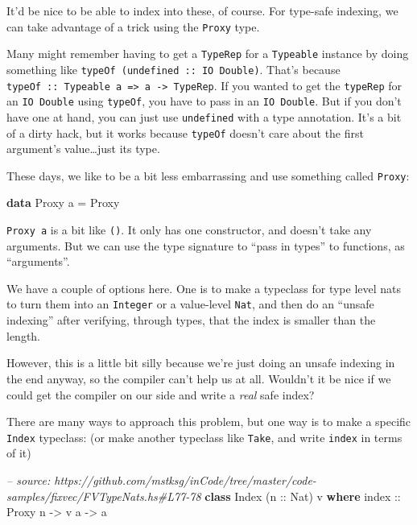 \documentclass[]{article}
\newenvironment{Shaded}{}{}
\newcommand{\KeywordTok}[1]{\textcolor[rgb]{0.00,0.44,0.13}{\textbf{{#1}}}}
\newcommand{\DataTypeTok}[1]{\textcolor[rgb]{0.56,0.13,0.00}{{#1}}}
\newcommand{\CommentTok}[1]{\textcolor[rgb]{0.38,0.63,0.69}{\textit{{#1}}}}
\newcommand{\OtherTok}[1]{\textcolor[rgb]{0.00,0.44,0.13}{{#1}}}
\newcommand{\FunctionTok}[1]{\textcolor[rgb]{0.02,0.16,0.49}{{#1}}}
\newcommand{\NormalTok}[1]{{#1}}
\begin{document}
It'd be nice to be able to index into these, of course. For type-safe
indexing, we can take advantage of a trick using the \texttt{Proxy}
type.

Many might remember having to get a \texttt{TypeRep} for a
\texttt{Typeable} instance by doing something like
\texttt{typeOf\ (undefined\ ::\ IO\ Double)}. That's because
\texttt{typeOf\ ::\ Typeable\ a\ =\textgreater{}\ a\ -\textgreater{}\ TypeRep}.
If you wanted to get the \texttt{typeRep} for an \texttt{IO\ Double}
using \texttt{typeOf}, you have to pass in an \texttt{IO\ Double}. But
if you don't have one at hand, you can just use \texttt{undefined} with
a type annotation. It's a bit of a dirty hack, but it works because
\texttt{typeOf} doesn't care about the first argument's
value\ldots{}just its type.

These days, we like to be a bit less embarrassing and use something
called \texttt{Proxy}:

\begin{Shaded}
\begin{Highlighting}[]
\KeywordTok{data} \DataTypeTok{Proxy} \NormalTok{a }\FunctionTok{=} \DataTypeTok{Proxy}
\end{Highlighting}
\end{Shaded}

\texttt{Proxy\ a} is a bit like \texttt{()}. It only has one
constructor, and doesn't take any arguments. But we can use the type
signature to ``pass in types'' to functions, as ``arguments''.

We have a couple of options here. One is to make a typeclass for type
level nats to turn them into an \texttt{Integer} or a value-level
\texttt{Nat}, and then do an ``unsafe indexing'' after verifying,
through types, that the index is smaller than the length.

However, this is a little bit silly because we're just doing an unsafe
indexing in the end anyway, so the compiler can't help us at all.
Wouldn't it be nice if we could get the compiler on our side and write a
\emph{real} safe index?

There are many ways to approach this problem, but one way is to make a
specific \texttt{Index} typeclass: (or make another typeclass like
\texttt{Take}, and write \texttt{index} in terms of it)

\begin{Shaded}
\begin{Highlighting}[]
\CommentTok{-- source: https://github.com/mstksg/inCode/tree/master/code-samples/fixvec/FVTypeNats.hs#L77-78}
\KeywordTok{class} \DataTypeTok{Index} \NormalTok{(}\OtherTok{n ::} \DataTypeTok{Nat}\NormalTok{) v }\KeywordTok{where}
\OtherTok{    index ::} \DataTypeTok{Proxy} \NormalTok{n }\OtherTok{->} \NormalTok{v a }\OtherTok{->} \NormalTok{a}
\end{Highlighting}
\end{Shaded}
\end{document}
